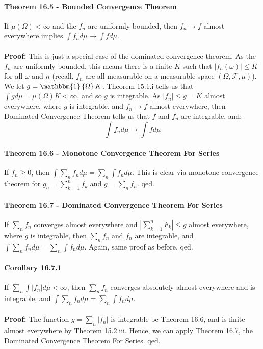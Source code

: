 \documentclass[12pt,a4paper]{article}
\newcommand{\1}[1]{\mathbbm{1}\left\{ #1 \right\}}
\newcommand{\fcal}{\mathcal{F}}
\begin{document}
\paragraph{Theorem 16.5 - Bounded Convergence Theorem} If $\mu(\Omega) < \infty$ and the $f_n$ are uniformly bounded, then $f_n \to f$ almost everywhere implies $\int f_n d\mu \to \int f d\mu$.
\\\\
\textbf{Proof:} This is just a special case of the dominated convergence theorem. As the $f_n$ are uniformly bounded, this means there is a finite $K$ such that $|f_n(\omega)| \leq K$ for all $\omega$ and $n$ (recall, $f_n$ are all measurable on a measurable space $(\Omega,\fcal,\mu)$). We let $g = \1{\Omega}K$. Theorem 15.1.i tells us that $\int g d\mu = \mu(\Omega)K < \infty$, and so $g$ is integrable. As $|f_n| \leq g = K$ almost everywhere, where $g$ is integrable, and $f_n \to f$ almost everywhere, then Dominated Convergence Theorem tells us that $f$ and $f_n$ are integrable, and:
$$
	\int f_n d\mu \to \int f d\mu
$$

\paragraph{Theorem 16.6 - Monotone Convergence Theorem For Series} If $f_n \geq 0$, then $\int \sum_n f_n d\mu = \sum_n \int f_n d\mu$. This is clear via monotone convergence theorem for $g_n = \sum_{k=1}^n f_k$ and $g = \sum_n f_n$. qed.

\paragraph{Theorem 16.7 - Dominated Convergence Theorem For Series} If $\sum_n f_n$ converges almost everywhere and $\left|\sum_{k=1}^n F_k\right| \leq g$ almost everywhere, where $g$ is integrable, then $\sum_n f_n$ and $f_n$ are integrable, and $\int \sum_n f_n d\mu = \sum_n \int f_n d\mu$. Again, same proof as before. qed.

\paragraph{Corollary 16.7.1} If $\sum_n \int |f_n| d\mu < \infty$, then $\sum_n f_n$ converges absolutely almost everywhere and is integrable, and $\int \sum_n f_n d\mu = \sum_n \int f_n d\mu$.
\\\\
\textbf{Proof:} The function $g = \sum_n |f_n|$ is integrable be Theorem 16.6, and is finite almost everywhere by Theorem 15.2.iii. Hence, we can apply Theorem 16.7, the Dominated Convergence Theorem For Series. qed.
\end{document}
